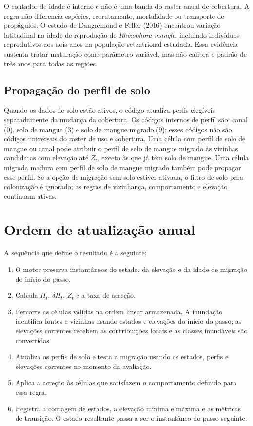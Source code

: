 \documentclass[11pt,a4paper]{article}
\begin{document}
O contador de idade é interno e não é uma banda do raster anual de cobertura. A regra não diferencia espécies, recrutamento, mortalidade ou transporte de propágulos. O estudo de Dangremond e Feller (2016) encontrou variação latitudinal na idade de reprodução de \textit{Rhizophora mangle}, incluindo indivíduos reprodutivos aos dois anos na população setentrional estudada. Essa evidência sustenta tratar maturação como parâmetro variável, mas não calibra o padrão de três anos para todas as regiões.

\subsection{Propagação do perfil de solo}

Quando os dados de solo estão ativos, o código atualiza perfis elegíveis separadamente da mudança da cobertura. Os códigos internos de perfil são: canal ($0$), solo de mangue ($3$) e solo de mangue migrado ($9$); esses códigos não são códigos universais do raster de uso e cobertura. Uma célula com perfil de solo de mangue ou canal pode atribuir o perfil de solo de mangue migrado às vizinhas candidatas com elevação até $Z_t$, exceto às que já têm solo de mangue. Uma célula migrada madura com perfil de solo de mangue migrado também pode propagar esse perfil. Se a opção de migração sem solo estiver ativada, o filtro de solo para colonização é ignorado; as regras de vizinhança, comportamento e elevação continuam ativas.

\section{Ordem de atualização anual}

A sequência que define o resultado é a seguinte:
\begin{enumerate}
\item O motor preserva instantâneos do estado, da elevação e da idade de migração do início do passo.
\item Calcula $H_t$, $\delta H_t$, $Z_t$ e a taxa de acreção.
\item Percorre as células válidas na ordem linear armazenada. A inundação identifica fontes e vizinhas usando estados e elevações do início do passo; as elevações correntes recebem as contribuições locais e as classes inundáveis são convertidas.
\item Atualiza os perfis de solo e testa a migração usando os estados, perfis e elevações correntes no momento da avaliação.
\item Aplica a acreção às células que satisfazem o comportamento definido para essa regra.
\item Registra a contagem de estados, a elevação mínima e máxima e as métricas de transição. O estado resultante passa a ser o instantâneo do passo seguinte.
\end{enumerate}
\end{document}
